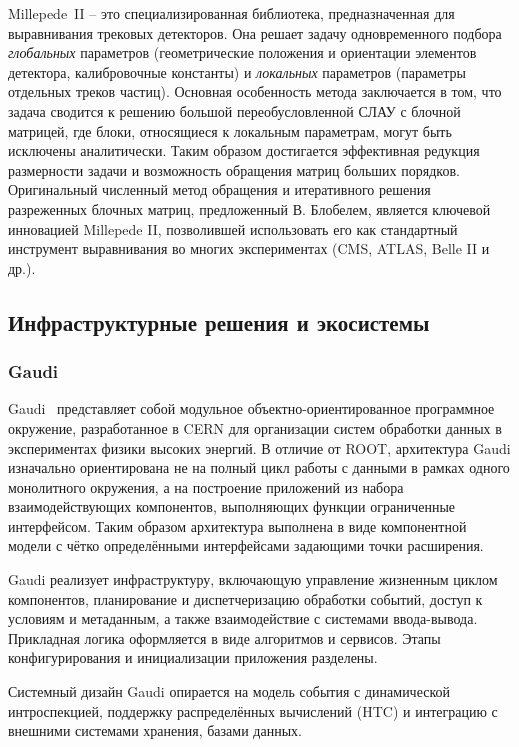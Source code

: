Millepede~II\cite{millipede-blobel2009} -- это специализированная
библиотека, предназначенная для выравнивания трековых детекторов.
Она решает задачу одновременного подбора \emph{глобальных} параметров
(геометрические положения и ориентации элементов детектора,
калибровочные константы) и \emph{локальных} параметров (параметры
отдельных треков частиц). Основная особенность метода
заключается в том, что задача сводится к решению большой
переобусловленной СЛАУ с блочной матрицей, где блоки, относящиеся
к локальным параметрам, могут быть исключены аналитически.
Таким образом достигается эффективная редукция размерности
задачи и возможность обращения матриц больших порядков.
Оригинальный численный метод обращения и итеративного
решения разреженных блочных матриц, предложенный
В. Блобелем, является ключевой инновацией Millepede II,
позволившей использовать его как стандартный инструмент
выравнивания во многих экспериментах (CMS, ATLAS, Belle II и др.).

\subsection{Инфраструктурные решения и экосистемы}

\subsubsection{Gaudi}

Gaudi~\cite{gaudi-framework-1} представляет собой модульное
объектно-ориентированное программное окружение, разработанное
в CERN для организации систем обработки данных в экспериментах
физики высоких энергий. В отличие от ROOT, архитектура Gaudi
изначально ориентирована не на полный цикл работы
с данными в рамках одного монолитного окружения, а на
построение приложений из набора взаимодействующих компонентов,
выполняющих функции ограниченные интерфейсом. Таким образом
архитектура выполнена в виде компонентной модели с чётко
определёнными интерфейсами задающими точки расширения.

Gaudi реализует инфраструктуру,
включающую управление жизненным циклом компонентов,
планирование и диспетчеризацию обработки событий, доступ к
условиям и метаданным, а также взаимодействие с системами
ввода-вывода. Прикладная логика оформляется в виде
алгоритмов и сервисов. Этапы конфигурирования и инициализации
приложения разделены.

Системный дизайн Gaudi опирается на модель события с динамической
интроспекцией, поддержку распределённых
вычислений (HTC) и интеграцию с внешними системами хранения,
базами данных.

